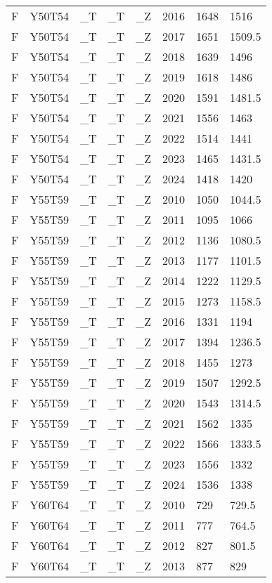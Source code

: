 \begin{longtable}[t]{llllllll}
F & Y50T54 & \_T & \_T & \_Z & 2016 & 1648 & 1516\\
F & Y50T54 & \_T & \_T & \_Z & 2017 & 1651 & 1509.5\\
F & Y50T54 & \_T & \_T & \_Z & 2018 & 1639 & 1496\\
F & Y50T54 & \_T & \_T & \_Z & 2019 & 1618 & 1486\\
\addlinespace
F & Y50T54 & \_T & \_T & \_Z & 2020 & 1591 & 1481.5\\
F & Y50T54 & \_T & \_T & \_Z & 2021 & 1556 & 1463\\
F & Y50T54 & \_T & \_T & \_Z & 2022 & 1514 & 1441\\
F & Y50T54 & \_T & \_T & \_Z & 2023 & 1465 & 1431.5\\
F & Y50T54 & \_T & \_T & \_Z & 2024 & 1418 & 1420\\
\addlinespace
F & Y55T59 & \_T & \_T & \_Z & 2010 & 1050 & 1044.5\\
F & Y55T59 & \_T & \_T & \_Z & 2011 & 1095 & 1066\\
F & Y55T59 & \_T & \_T & \_Z & 2012 & 1136 & 1080.5\\
F & Y55T59 & \_T & \_T & \_Z & 2013 & 1177 & 1101.5\\
F & Y55T59 & \_T & \_T & \_Z & 2014 & 1222 & 1129.5\\
\addlinespace
F & Y55T59 & \_T & \_T & \_Z & 2015 & 1273 & 1158.5\\
F & Y55T59 & \_T & \_T & \_Z & 2016 & 1331 & 1194\\
F & Y55T59 & \_T & \_T & \_Z & 2017 & 1394 & 1236.5\\
F & Y55T59 & \_T & \_T & \_Z & 2018 & 1455 & 1273\\
F & Y55T59 & \_T & \_T & \_Z & 2019 & 1507 & 1292.5\\
\addlinespace
F & Y55T59 & \_T & \_T & \_Z & 2020 & 1543 & 1314.5\\
F & Y55T59 & \_T & \_T & \_Z & 2021 & 1562 & 1335\\
F & Y55T59 & \_T & \_T & \_Z & 2022 & 1566 & 1333.5\\
F & Y55T59 & \_T & \_T & \_Z & 2023 & 1556 & 1332\\
F & Y55T59 & \_T & \_T & \_Z & 2024 & 1536 & 1338\\
\addlinespace
F & Y60T64 & \_T & \_T & \_Z & 2010 & 729 & 729.5\\
F & Y60T64 & \_T & \_T & \_Z & 2011 & 777 & 764.5\\
F & Y60T64 & \_T & \_T & \_Z & 2012 & 827 & 801.5\\
F & Y60T64 & \_T & \_T & \_Z & 2013 & 877 & 829\\

\end{longtable}

